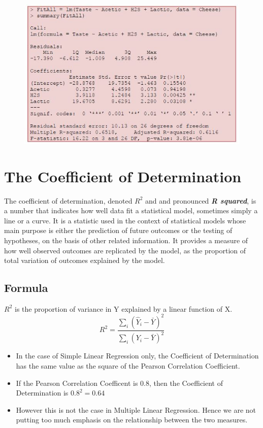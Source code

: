 \documentclass[a4paper,12pt]{article}
\begin{document}

\begin{figure}[h!]
\centering
\includegraphics[width=1\linewidth]{images/MLR-CheeseRegressionSummary}
\end{figure}
\newpage
\section{The Coefficient of Determination}
The coefficient of determination, denoted $R^2$ and and pronounced \textbf{\textit{R squared}}, is a number that indicates how well data fit a statistical model, sometimes simply a line or a curve. It is a statistic used in the context of statistical models whose main purpose is either the prediction of future outcomes or the testing of hypotheses, on the basis of other related information. It provides a measure of how well observed outcomes are replicated by the model, as the proportion of total variation of outcomes explained by the model.

\subsection*{Formula}
$R^2$ is the proportion of variance in Y explained by a linear function of X.
\[R^2 = \frac{\sum_i(\hat{Y}_i-\bar{Y})^2}{\sum_i(Y_i-\bar{Y})^2}\]

\bigskip
\begin{itemize}
	\item In the case of Simple Linear Regression only, the Coefficient of Determination has the same value as the square of the Pearson Correlation Coefficient. 
	\item If the Pearson Correlation Coefficent is 0.8, then the Coefficient of Determination is $0.8^2 =  0.64$
	\item However this is not the case in Multiple Linear Regression. Hence we are not putting too much emphasis on the relationship between the two measures. 
\end{itemize}
\end{document}
